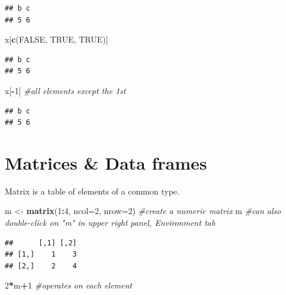 \documentclass[]{article}
\newenvironment{Shaded}{\begin{snugshade}}{\end{snugshade}}
\newcommand{\KeywordTok}[1]{\textcolor[rgb]{0.13,0.29,0.53}{\textbf{#1}}}
\newcommand{\DataTypeTok}[1]{\textcolor[rgb]{0.13,0.29,0.53}{#1}}
\newcommand{\DecValTok}[1]{\textcolor[rgb]{0.00,0.00,0.81}{#1}}
\newcommand{\StringTok}[1]{\textcolor[rgb]{0.31,0.60,0.02}{#1}}
\newcommand{\CommentTok}[1]{\textcolor[rgb]{0.56,0.35,0.01}{\textit{#1}}}
\newcommand{\OtherTok}[1]{\textcolor[rgb]{0.56,0.35,0.01}{#1}}
\newcommand{\OperatorTok}[1]{\textcolor[rgb]{0.81,0.36,0.00}{\textbf{#1}}}
\newcommand{\NormalTok}[1]{#1}
\begin{document}
\begin{verbatim}
## b c 
## 5 6
\end{verbatim}

\begin{Shaded}
\begin{Highlighting}[]
\NormalTok{x[}\KeywordTok{c}\NormalTok{(}\OtherTok{FALSE}\NormalTok{, }\OtherTok{TRUE}\NormalTok{, }\OtherTok{TRUE}\NormalTok{)]}
\end{Highlighting}
\end{Shaded}

\begin{verbatim}
## b c 
## 5 6
\end{verbatim}

\begin{Shaded}
\begin{Highlighting}[]
\NormalTok{x[}\OperatorTok{-}\DecValTok{1}\NormalTok{] }\CommentTok{#all elements except the 1st}
\end{Highlighting}
\end{Shaded}

\begin{verbatim}
## b c 
## 5 6
\end{verbatim}

\section{Matrices \& Data frames}\label{matrices-data-frames}

Matrix is a table of elements of a common type.

\begin{Shaded}
\begin{Highlighting}[]
\NormalTok{m <-}\StringTok{ }\KeywordTok{matrix}\NormalTok{(}\DecValTok{1}\OperatorTok{:}\DecValTok{4}\NormalTok{, }\DataTypeTok{ncol=}\DecValTok{2}\NormalTok{, }\DataTypeTok{nrow=}\DecValTok{2}\NormalTok{) }\CommentTok{#create a numeric matrix}
\NormalTok{m }\CommentTok{#can also double-click on "m" in upper right panel, Environment tab}
\end{Highlighting}
\end{Shaded}

\begin{verbatim}
##      [,1] [,2]
## [1,]    1    3
## [2,]    2    4
\end{verbatim}

\begin{Shaded}
\begin{Highlighting}[]
\DecValTok{2}\OperatorTok{*}\NormalTok{m}\OperatorTok{+}\DecValTok{1} \CommentTok{#operates on each element}
\end{Highlighting}
\end{Shaded}
\end{document}
